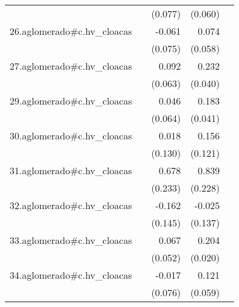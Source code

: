 {\begin{longtable}{l*{4}{D{.}{.}{-1}}}
            &                     &     (0.077)         &     (0.060)         &                     \\
\addlinespace
26.aglomerado#c.hv\_cloacas&                     &      -0.061         &       0.074         &                     \\
            &                     &     (0.075)         &     (0.058)         &                     \\
\addlinespace
27.aglomerado#c.hv\_cloacas&                     &       0.092         &       0.232\sym{***}&                     \\
            &                     &     (0.063)         &     (0.040)         &                     \\
\addlinespace
29.aglomerado#c.hv\_cloacas&                     &       0.046         &       0.183\sym{***}&                     \\
            &                     &     (0.064)         &     (0.041)         &                     \\
\addlinespace
30.aglomerado#c.hv\_cloacas&                     &       0.018         &       0.156         &                     \\
            &                     &     (0.130)         &     (0.121)         &                     \\
\addlinespace
31.aglomerado#c.hv\_cloacas&                     &       0.678\sym{**} &       0.839\sym{***}&                     \\
            &                     &     (0.233)         &     (0.228)         &                     \\
\addlinespace
32.aglomerado#c.hv\_cloacas&                     &      -0.162         &      -0.025         &                     \\
            &                     &     (0.145)         &     (0.137)         &                     \\
\addlinespace
33.aglomerado#c.hv\_cloacas&                     &       0.067         &       0.204\sym{***}&                     \\
            &                     &     (0.052)         &     (0.020)         &                     \\
\addlinespace
34.aglomerado#c.hv\_cloacas&                     &      -0.017         &       0.121\sym{*}  &                     \\
            &                     &     (0.076)         &     (0.059)         &                     \\

\end{longtable}}
